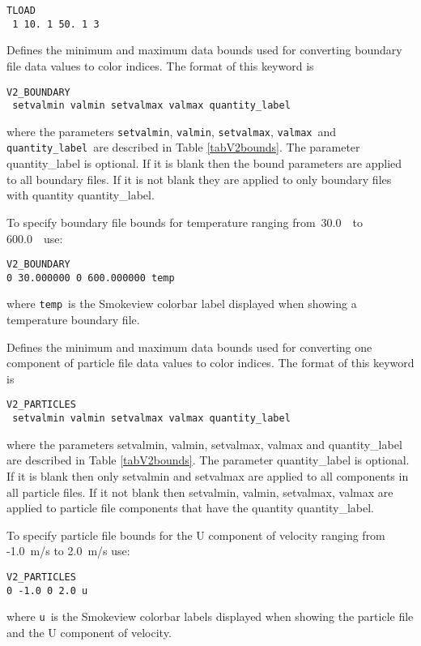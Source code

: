 \documentclass[11pt,twoside]{book}
\newcommand{\hitem}[1]{\item[{\bf #1} \hfill]}
\begin{document}
\begin{lstlisting}
TLOAD
 1 10. 1 50. 1 3
\end{lstlisting}

\hitem{V2\_BOUNDARY}Defines the minimum and maximum
data bounds used for converting boundary file data values to color indices.
The format of this keyword is
\begin{lstlisting}
V2_BOUNDARY
 setvalmin valmin setvalmax valmax quantity_label
\end{lstlisting}
where the parameters
{\tt setvalmin}, {\tt valmin}, {\tt setvalmax}, {\tt valmax}\ and {\tt quantity\_label}\
are described in Table \ref{tabV2bounds}.
The parameter quantity\_label is optional.  If it is blank then the bound
parameters are applied to all boundary files.
If it is not blank they
are applied to only boundary files with quantity quantity\_label.

To specify boundary file bounds for temperature ranging from\
30.0~\degC\ to 600.0~\degC\ use:
\begin{lstlisting}
V2_BOUNDARY
0 30.000000 0 600.000000 temp
\end{lstlisting}
where {\tt temp}\ is the Smokeview colorbar label displayed when
showing a temperature boundary file.

\hitem{V2\_PARTICLES}Defines the minimum and maximum
data bounds used for converting one component of particle file data values to color indices.
The format of this keyword is
\begin{lstlisting}
V2_PARTICLES
 setvalmin valmin setvalmax valmax quantity_label
\end{lstlisting}
where the parameters setvalmin, valmin, setvalmax, valmax and quantity\_label are described in Table \ref{tabV2bounds}.
The parameter quantity\_label is optional.  If it is blank then only setvalmin and setvalmax are applied to all components in all particle files. If it not blank then setvalmin, valmin,
setvalmax, valmax are applied to particle file components that have the quantity quantity\_label.

To specify particle file bounds for the U component of velocity ranging from
-1.0~m/s to 2.0~m/s use:
\begin{lstlisting}
V2_PARTICLES
0 -1.0 0 2.0 u
\end{lstlisting}
where {\tt u}\ is the Smokeview colorbar labels displayed when
showing the particle file and the U component of velocity.
\end{document}
